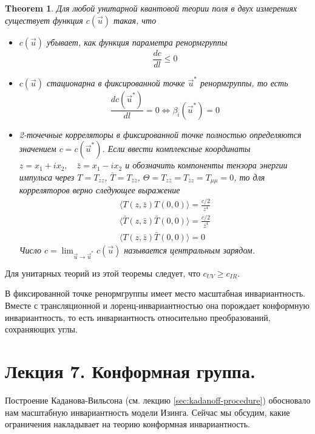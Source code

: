 \documentclass[a4paper,12pt]{article}
\newtheorem{theorem}{Theorem}
\theoremstyle{definition}
\theoremstyle{definition}
\theoremstyle{definition}
\begin{document}
\begin{theorem}
  Для любой унитарной квантовой теории поля в двух измерениях существует функция $c(\vec u)$ такая, что
  \label{c-theorem}
  \begin{itemize}
  \item $c(\vec u)$ убывает, как функция параметра ренормгруппы
    \begin{equation}
      \label{eq:95}
      \frac{dc}{dl}\leq 0
    \end{equation}
  \item $c(\vec u)$ стационарна в фиксированной точке $\vec u^*$ ренормгруппы, то есть
    \begin{equation}
      \label{eq:96}
      \frac{dc({\vec u^*})}{dl}=0 \Leftrightarrow \beta_i(\vec u^*)=0
    \end{equation}
  \item 2-точечные корреляторы в фиксированной точке полностью определяются значением $c=c(\vec u^*)$.
    Если ввести комплексные координаты $z=x_1+ix_2,\quad \bar z=x_1-ix_2$ и обозначить компоненты тензора энергии импульса через $T=T_{zz}$, $\bar T=T_{\bar z\bar z}$, $\Theta=T_{z\bar z}=T_{\bar z z}=T_{\mu\mu}=0$, то для корреляторов верно следующее выражение
    \begin{eqnarray}
      \label{eq:97}
      \langle T(z,\bar z)T(0,0)\rangle=\frac{c/2}{z^4}\\
      \langle \bar T(z,\bar z)\bar T(0,0)\rangle=\frac{c/2}{\bar z^4}\\
      \langle T(z,\bar z) \bar T(0,0)\rangle=0
    \end{eqnarray}
    Число $c=\lim_{\vec u\to \vec u^*} c(\vec u)$ называется центральным зарядом. 
  \end{itemize}
\end{theorem}
Для унитарных теорий из этой теоремы следует, что $c_{UV}\geq c_{IR}$.

В фиксированной точке ренормгруппы имеет место масштабная инвариантность. Вместе с трансляционной и лоренц-инвариантностью она порождает конформную инвариантность, то есть инвариантность относительно преобразований, сохраняющих углы.

\section{Лекция 7. Конформная группа.}
\label{sec:lecture-7}

Построение Каданова-Вильсона (см. лекцию \ref{sec:kadanoff-procedure}) обосновало нам масштабную инвариантность модели Изинга. Сейчас мы обсудим, какие ограничения накладывает на теорию конформная инвариантность. 
\end{document}
